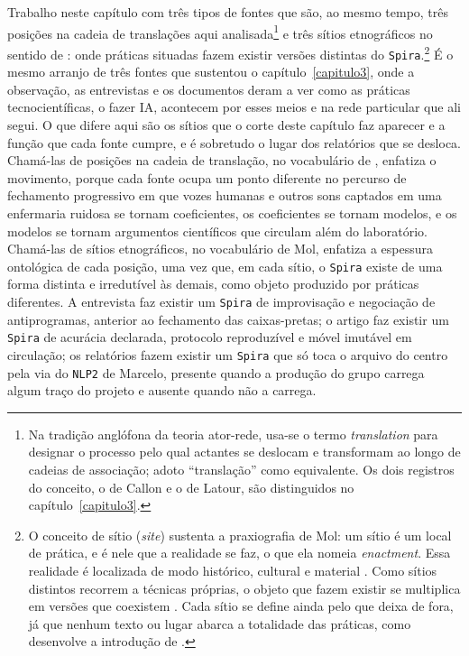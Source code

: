 Trabalho neste capítulo com três tipos de fontes que são, ao mesmo tempo, três posições na cadeia de translações aqui analisada\footnote{Na tradição anglófona da teoria ator-rede, usa-se o termo \textit{translation} para designar o processo pelo qual actantes se deslocam e transformam ao longo de cadeias de associação; adoto \enquote{translação} como equivalente. Os dois registros do conceito, o de Callon e o de Latour, são distinguidos no capítulo~\ref{capitulo3}.} e três sítios etnográficos no sentido de \textcite{mol2002body}: onde práticas situadas fazem existir versões distintas do \texttt{Spira}.\footnote{O conceito de sítio (\textit{site}) sustenta a praxiografia de Mol: um sítio é um local de prática, e é nele que a realidade se faz, o que ela nomeia \textit{enactment}. Essa realidade é localizada de modo histórico, cultural e material \parencite{mol1999ontological}. Como sítios distintos recorrem a técnicas próprias, o objeto que fazem existir se multiplica em versões que coexistem \parencite{mol2002body,mol1994regions}. Cada sítio se define ainda pelo que deixa de fora, já que nenhum texto ou lugar abarca a totalidade das práticas, como desenvolve a introdução de \textcite{law2002complexities}.} É o mesmo arranjo de três fontes que sustentou o capítulo~\ref{capitulo3}, onde a observação, as entrevistas e os documentos deram a ver como as práticas tecnocientíficas, o fazer IA, acontecem por esses meios e na rede particular que ali segui. O que difere aqui são os sítios que o corte deste capítulo faz aparecer e a função que cada fonte cumpre, e é sobretudo o lugar dos relatórios que se desloca. Chamá-las de posições na cadeia de translação, no vocabulário de \textcite{Latour2017Esperanca}, enfatiza o movimento, porque cada fonte ocupa um ponto diferente no percurso de fechamento progressivo em que vozes humanas e outros sons captados em uma enfermaria ruidosa se tornam coeficientes, os coeficientes se tornam modelos, e os modelos se tornam argumentos científicos que circulam além do laboratório. Chamá-las de sítios etnográficos, no vocabulário de Mol, enfatiza a espessura ontológica de cada posição, uma vez que, em cada sítio, o \texttt{Spira} existe de uma forma distinta e irredutível às demais, como objeto produzido por práticas diferentes. A entrevista faz existir um \texttt{Spira} de improvisação e negociação de antiprogramas, anterior ao fechamento das caixas-pretas; o artigo faz existir um \texttt{Spira} de acurácia declarada, protocolo reproduzível e móvel imutável em circulação; os relatórios fazem existir um \texttt{Spira} que só toca o arquivo do centro pela via do \texttt{NLP2} de Marcelo, presente quando a produção do grupo carrega algum traço do projeto e ausente quando não a carrega.

